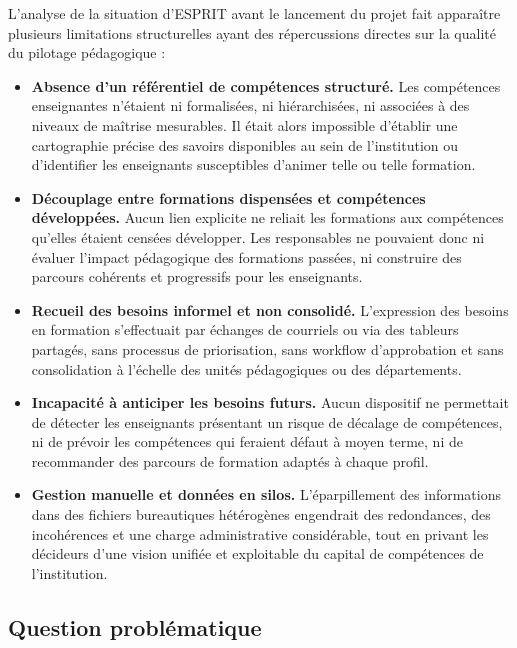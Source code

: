 \documentclass[12pt,a4paper]{report}
\begin{document}
L'analyse de la situation d'ESPRIT avant le lancement du projet fait apparaître
plusieurs limitations structurelles ayant des répercussions directes sur la
qualité du pilotage pédagogique :

\begin{itemize}[leftmargin=1.2cm]
  \item \textbf{Absence d'un référentiel de compétences structuré.}
  Les compétences enseignantes n'étaient ni formalisées, ni hiérarchisées, ni
  associées à des niveaux de maîtrise mesurables. Il était alors impossible
  d'établir une cartographie précise des savoirs disponibles au sein de
  l'institution ou d'identifier les enseignants susceptibles d'animer telle ou
  telle formation.

  \item \textbf{Découplage entre formations dispensées et compétences développées.}
  Aucun lien explicite ne reliait les formations aux compétences qu'elles
  étaient censées développer. Les responsables ne pouvaient donc ni évaluer
  l'impact pédagogique des formations passées, ni construire des parcours
  cohérents et progressifs pour les enseignants.

  \item \textbf{Recueil des besoins informel et non consolidé.}
  L'expression des besoins en formation s'effectuait par échanges de courriels
  ou via des tableurs partagés, sans processus de priorisation, sans workflow
  d'approbation et sans consolidation à l'échelle des unités pédagogiques ou
  des départements.

  \item \textbf{Incapacité à anticiper les besoins futurs.}
  Aucun dispositif ne permettait de détecter les enseignants présentant un
  risque de décalage de compétences, ni de prévoir les compétences qui feraient
  défaut à moyen terme, ni de recommander des parcours de formation adaptés à
  chaque profil.

  \item \textbf{Gestion manuelle et données en silos.}
  L'éparpillement des informations dans des fichiers bureautiques hétérogènes
  engendrait des redondances, des incohérences et une charge administrative
  considérable, tout en privant les décideurs d'une vision unifiée et exploitable
  du capital de compétences de l'institution.
\end{itemize}

\subsection{Question problématique}
\end{document}
